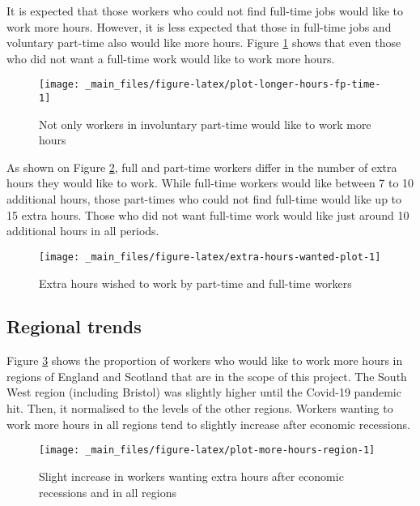 \documentclass[
]{book}
\begin{document}
It is expected that those workers who could not find full-time jobs would like to work more hours. However, it is less expected that those in full-time jobs and voluntary part-time also would like more hours. Figure \ref{fig:plot-longer-hours-fp-time} shows that even those who did not want a full-time work would like to work more hours.

\begin{figure}

{\centering \texttt{[image: \_main\_files/figure-latex/plot-longer-hours-fp-time-1]} 

}

\caption{Not only workers in involuntary part-time would like to work more hours}\label{fig:plot-longer-hours-fp-time}
\end{figure}

As shown on Figure \ref{fig:extra-hours-wanted-plot}, full and part-time workers differ in the number of extra hours they would like to work. While full-time workers would like between 7 to 10 additional hours, those part-times who could not find full-time would like up to 15 extra hours. Those who did not want full-time work would like just around 10 additional hours in all periods.

\begin{figure}

{\centering \texttt{[image: \_main\_files/figure-latex/extra-hours-wanted-plot-1]} 

}

\caption{Extra hours wished to work by part-time and full-time workers}\label{fig:extra-hours-wanted-plot}
\end{figure}

\hypertarget{regional-trends-1}{%
\subsection{Regional trends}\label{regional-trends-1}}

Figure \ref{fig:plot-more-hours-region} shows the proportion of workers who would like to work more hours in regions of England and Scotland that are in the scope of this project. The South West region (including Bristol) was slightly higher until the Covid-19 pandemic hit. Then, it normalised to the levels of the other regions. Workers wanting to work more hours in all regions tend to slightly increase after economic recessions.

\begin{figure}

{\centering \texttt{[image: \_main\_files/figure-latex/plot-more-hours-region-1]} 

}

\caption{Slight increase in workers wanting extra hours after economic recessions and in all regions}\label{fig:plot-more-hours-region}
\end{figure}
\end{document}
